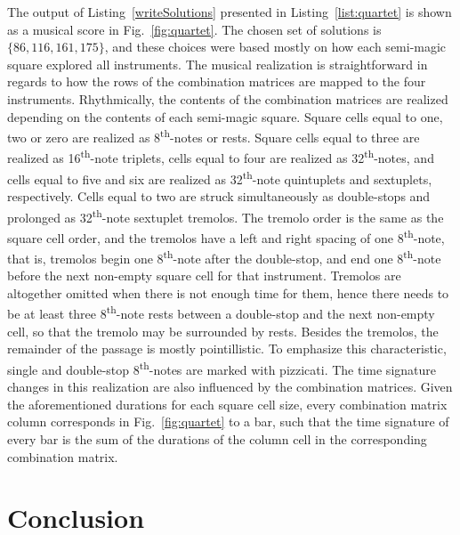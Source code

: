 The output of Listing~\ref{writeSolutions} presented in Listing~\ref{list:quartet} is shown as a musical score in Fig.~\ref{fig:quartet}. The chosen set of solutions is $\{86, 116, 161, 175\}$, and these choices were based mostly on how each semi-magic square explored all instruments. The musical realization is straightforward in regards to how the rows of the combination matrices are mapped to the four instruments. Rhythmically, the contents of the combination matrices are realized depending on the contents of each semi-magic square. Square cells equal to one, two or zero are realized as 8\textsuperscript{th}-notes or rests. Square cells equal to three are realized as 16\textsuperscript{th}-note triplets, cells equal to four are realized as 32\textsuperscript{th}-notes, and cells equal to five and six are realized as 32\textsuperscript{th}-note quintuplets and sextuplets, respectively. Cells equal to two are struck simultaneously as double-stops and prolonged as 32\textsuperscript{th}-note sextuplet tremolos. The tremolo order is the same as the square cell order, and the tremolos have a left and right spacing of one 8\textsuperscript{th}-note, that is, tremolos begin one 8\textsuperscript{th}-note after the double-stop, and end one 8\textsuperscript{th}-note before the next non-empty square cell for that instrument. Tremolos are altogether omitted when there is not enough time for them, hence there needs to be at least three 8\textsuperscript{th}-note rests between a double-stop and the next non-empty cell, so that the tremolo may be surrounded by rests. Besides the tremolos, the remainder of the passage is mostly pointillistic. To emphasize this characteristic, single and double-stop 8\textsuperscript{th}-notes are marked with pizzicati. The time signature changes in this realization are also influenced by the combination matrices. Given the aforementioned durations for each square cell size, every combination matrix column corresponds in Fig.~\ref{fig:quartet} to a bar, such that the time signature of every bar is the sum of the durations of the column cell in the corresponding combination matrix.

\section{Conclusion}

